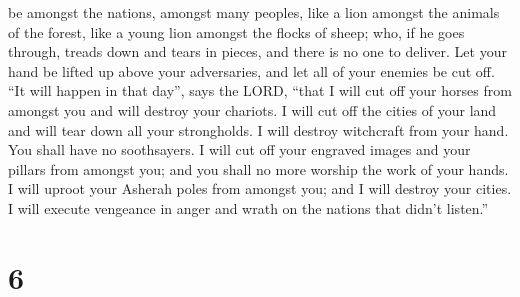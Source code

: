 be amongst the nations, amongst many peoples, like a lion amongst the
animals of the forest, like a young lion amongst the flocks of sheep;
who, if he goes through, treads down and tears in pieces, and there is
no one to deliver.  Let your hand be lifted up above your
adversaries, and let all of your enemies be cut off.  ``It
will happen in that day'', says the LORD, ``that I will cut off your
horses from amongst you and will destroy your chariots.  I
will cut off the cities of your land and will tear down all your
strongholds.  I will destroy witchcraft from your hand. You
shall have no soothsayers.  I will cut off your engraved
images and your pillars from amongst you; and you shall no more worship
the work of your hands.  I will uproot your Asherah poles
from amongst you; and I will destroy your cities.  I will
execute vengeance in anger and wrath on the nations that didn't
listen.''

\hypertarget{section-2}{%
\section{6}\label{section-2}}

